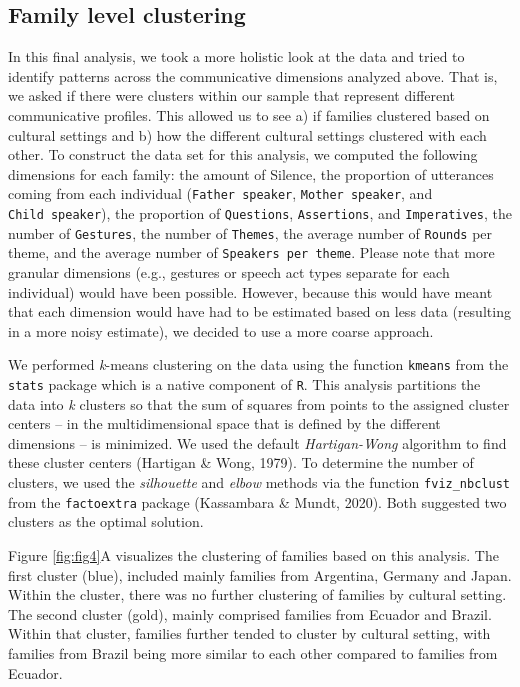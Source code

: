 \documentclass[
  man,floatsintext]{apa6}
\begin{document}
\hypertarget{family-level-clustering}{%
\subsection{Family level clustering}\label{family-level-clustering}}

In this final analysis, we took a more holistic look at the data and tried to identify patterns across the communicative dimensions analyzed above. That is, we asked if there were clusters within our sample that represent different communicative profiles. This allowed us to see a) if families clustered based on cultural settings and b) how the different cultural settings clustered with each other. To construct the data set for this analysis, we computed the following dimensions for each family: the amount of Silence, the proportion of utterances coming from each individual (\texttt{Father\ speaker}, \texttt{Mother\ speaker}, and \texttt{Child\ speaker}), the proportion of \texttt{Questions}, \texttt{Assertions}, and \texttt{Imperatives}, the number of \texttt{Gestures}, the number of \texttt{Themes}, the average number of \texttt{Rounds} per theme, and the average number of \texttt{Speakers\ per\ theme}. Please note that more granular dimensions (e.g., gestures or speech act types separate for each individual) would have been possible. However, because this would have meant that each dimension would have had to be estimated based on less data (resulting in a more noisy estimate), we decided to use a more coarse approach.

We performed \emph{k}-means clustering on the data using the function \texttt{kmeans} from the \texttt{stats} package which is a native component of \texttt{R}. This analysis partitions the data into \emph{k} clusters so that the sum of squares from points to the assigned cluster centers -- in the multidimensional space that is defined by the different dimensions -- is minimized. We used the default \emph{Hartigan-Wong} algorithm to find these cluster centers (Hartigan \& Wong, 1979). To determine the number of clusters, we used the \emph{silhouette} and \emph{elbow} methods via the function \texttt{fviz\_nbclust} from the \texttt{factoextra} package (Kassambara \& Mundt, 2020). Both suggested two clusters as the optimal solution.

Figure \ref{fig:fig4}A visualizes the clustering of families based on this analysis. The first cluster (blue), included mainly families from Argentina, Germany and Japan. Within the cluster, there was no further clustering of families by cultural setting. The second cluster (gold), mainly comprised families from Ecuador and Brazil. Within that cluster, families further tended to cluster by cultural setting, with families from Brazil being more similar to each other compared to families from Ecuador.
\end{document}
